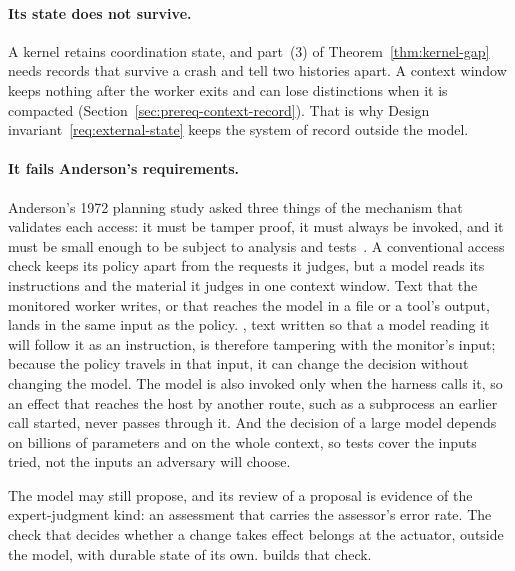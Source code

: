 \paragraph{Its state does not survive.}
A kernel retains coordination state, and part~(3) of
Theorem~\ref{thm:kernel-gap} needs records that survive a crash and tell two
histories apart. A context window keeps nothing after the worker exits and can
lose distinctions when it is compacted
(Section~\ref{sec:prereq-context-record}). That is why Design
invariant~\ref{req:external-state} keeps the system of record outside the
model.

\paragraph{It fails Anderson's requirements.}
Anderson's 1972 planning study asked three things of the mechanism that
validates each access: it must be tamper proof, it must always be invoked, and
it must be small enough to be subject to analysis and
tests~. A conventional access check keeps its policy apart
from the requests it judges, but a model reads its instructions and the
material it judges in one context window. Text that the monitored worker
writes, or that reaches the model in a file or a tool's output, lands in the
same input as the policy. , text
written so that a model reading it will follow it as an instruction, is
therefore tampering with the monitor's input; because the policy travels in
that input, it can change the decision without changing the model. The model
is also invoked only when the harness calls it, so an effect that reaches the
host by another route, such as a subprocess an earlier call started, never
passes through it. And the decision of a large model depends on billions of
parameters and on the whole context, so tests cover the inputs tried, not the
inputs an adversary will choose.

The model may still propose, and its review of a proposal is evidence of the
expert-judgment kind: an assessment that carries the assessor's error rate.
The check that decides whether a change takes effect belongs at the actuator,
outside the model, with durable state of its own.
 builds that check.


